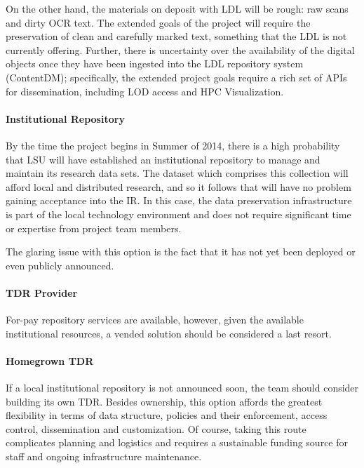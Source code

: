 On the other hand, the materials on deposit with LDL will be rough: raw scans and dirty OCR text. The extended goals of the project will require the preservation of clean and carefully marked text, something that the LDL is not currently offering. Further, there is uncertainty over the availability of the digital objects once they have been ingested into the LDL repository system (ContentDM); specifically, the extended project goals require a rich set of APIs for dissemination, including LOD access and HPC Visualization.

\paragraph{Institutional Repository}
By the time the project begins in Summer of 2014, there is a high probability that LSU will have established an institutional repository to manage and maintain its research data sets. The dataset which comprises this collection will afford local and distributed research, and so it follows that \projectname{} will have no problem gaining acceptance into the IR. In this case, the data preservation infrastructure is part of the local technology environment and does not require significant time or expertise from project team members.

The glaring issue with this option is the fact that it has not yet been deployed or even publicly announced.

\paragraph{TDR Provider}
For-pay repository services are available, however, given the available institutional resources, a vended solution should be considered a last resort.

\paragraph{Homegrown TDR}
If a local institutional repository is not announced soon, the team should consider building its own TDR. Besides ownership, this option affords the greatest flexibility in terms of data structure, policies and their enforcement, access control, dissemination and customization. Of course, taking this route complicates planning and logistics and requires a sustainable funding source for staff and ongoing infrastructure maintenance.

